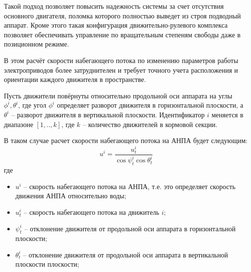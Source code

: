 Такой подход позволяет повысить надежность системы за счет отсутствия основного двигателя, поломка которого полностью выведет из строя подводный аппарат.
Кроме этого такая конфигурация движительно-рулевого комплекса позволяет обеспечивать управление по вращательным степеням свободы даже в позиционном режиме.

В этом расчёт скорости набегающего потока по изменению параметров работы электроприводов более затруднителен и требует точного учета расположения и ориентации каждого движителя в пространстве.

Пусть движители повёрнуты относительно продольной оси аппарата на углы $\phi^i, \theta^i$, где угол $\phi^i$ определяет разворот движителя в горизонтальной плоскости, а $\theta^i$ -- разворот движителя в вертикальной плоскости.
Идентификатор $i$ меняется в диапазоне $[1,..,k]$, где $k$ -- количество движителей в кормовой секции.

В таком случае расчет скорости набегающего потока на АНПА будет следующим:
\begin{equation}
    \label{eq:velocity_orientation}
    u^i = \frac{u^i_t}{\cos{\psi^i_t}\cos{\theta^i_t}}
\end{equation}
\noindent где
\begin{itemize}
    \item $u^i$ -- скорость набегающего потока на АНПА, т.е. это определяет скорость движения АНПА относительно воды;
    \item $u^i_t$ -- скорость набегающего потока на движитель $i$;
    \item $\psi^i_t$ -- отклонение движителя от продольной оси аппарата в горизонтальной плоскости;
    \item $\theta^i_t$ -- отклонение движителя от продольной оси аппарата в вертикальной плоскости плоскости;
\end{itemize}



